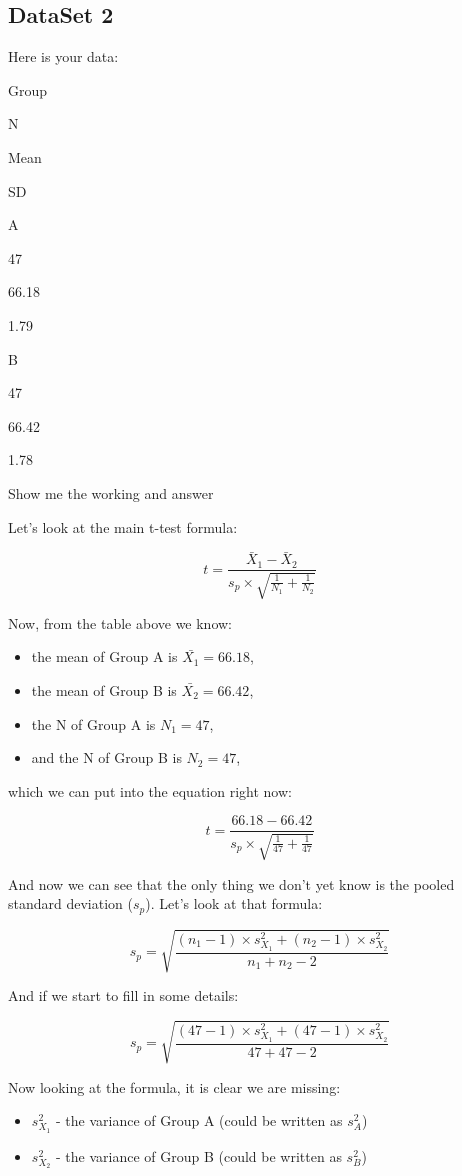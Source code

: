 \documentclass[
  oneside]{book}
\providecommand{\tightlist}{%
  \setlength{\itemsep}{0pt}\setlength{\parskip}{0pt}}
\begin{document}
\hypertarget{dataset-2-1}{%
\subsection{DataSet 2}\label{dataset-2-1}}

Here is your data:

Group

N

Mean

SD

A

47

66.18

1.79

B

47

66.42

1.78

Show me the working and answer

Let's look at the main t-test formula:

\[t = \frac{\bar{X}_1 - \bar{X}_2}{s_p \times \sqrt{\frac{1}{N_1} + \frac{1}{N_2}}}\]

Now, from the table above we know:

\begin{itemize}
\tightlist
\item
  the mean of Group A is \(\bar{X_1} = 66.18\),
\item
  the mean of Group B is \(\bar{X_2} = 66.42\),
\item
  the N of Group A is \(N_1 = 47\),
\item
  and the N of Group B is \(N_2 = 47\),
\end{itemize}

which we can put into the equation right now:

\[t = \frac{66.18 - 66.42}{s_p \times \sqrt{\frac{1}{47} + \frac{1}{47}}}\]

And now we can see that the only thing we don't yet know is the pooled standard deviation (\(s_p\)). Let's look at that formula:

\[s_p = \sqrt{\frac{(n_1 -1)  \times s^2_{X_1} + (n_2 -1)\times s^2_{X_2}}{n_1 + n_2 - 2}}\]

And if we start to fill in some details:

\[s_p = \sqrt{\frac{(47 -1)  \times s^2_{X_1} + (47 -1)\times s^2_{X_2}}{47 + 47 - 2}}\]

Now looking at the formula, it is clear we are missing:

\begin{itemize}
\tightlist
\item
  \(s^2_{X_1}\) - the variance of Group A (could be written as \(s^2_{A}\))
\item
  \(s^2_{X_2}\) - the variance of Group B (could be written as \(s^2_{B}\))
\end{itemize}
\end{document}
